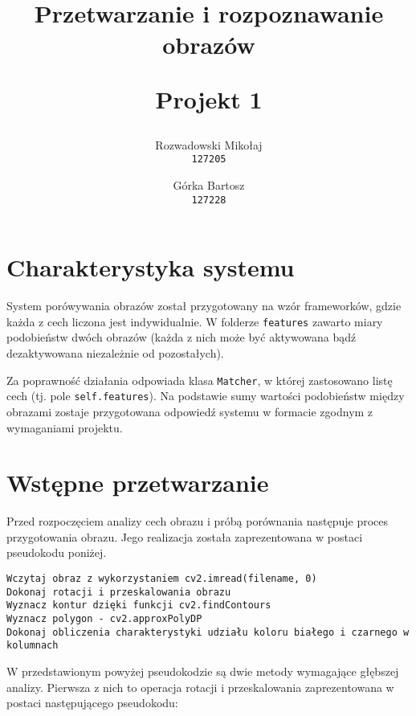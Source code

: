 \documentclass{mwart}
\begin{document}
\title{
    \textbf{Przetwarzanie i rozpoznawanie obrazów}\\
    \begin{large}
        Projekt 1
    \end{large}
}

\author{
    Rozwadowski Mikołaj\\
  \texttt{127205}
  \and
    Górka Bartosz\\
  \texttt{127228}
}

\date{}

\maketitle

\section{Charakterystyka systemu}
\label{section:wstep}
System porówywania obrazów został przygotowany na wzór frameworków, gdzie każda z cech liczona jest indywidualnie. W folderze \texttt{features} zawarto miary podobieństw dwóch obrazów (każda z nich może być aktywowana bądź dezaktywowana niezależnie od pozostałych).

Za poprawność działania odpowiada klasa \texttt{Matcher}, w której zastosowano listę cech (tj. pole \texttt{self.features}). Na podstawie sumy wartości podobieństw między obrazami zostaje przygotowana odpowiedź systemu w formacie zgodnym z wymaganiami projektu.

\section{Wstępne przetwarzanie}
\label{section:preprocessing}
Przed rozpoczęciem analizy cech obrazu i próbą porównania następuje proces przygotowania obrazu. Jego realizacja została zaprezentowana w postaci pseudokodu poniżej.

\begin{verbatim}
Wczytaj obraz z wykorzystaniem cv2.imread(filename, 0)
Dokonaj rotacji i przeskalowania obrazu
Wyznacz kontur dzięki funkcji cv2.findContours
Wyznacz polygon - cv2.approxPolyDP
Dokonaj obliczenia charakterystyki udziału koloru białego i czarnego w kolumnach
\end{verbatim}

W przedstawionym powyżej pseudokodzie są dwie metody wymagające głębszej analizy. Pierwsza z nich to operacja rotacji i przeskalowania zaprezentowana w postaci następującego pseudokodu:
\end{document}
